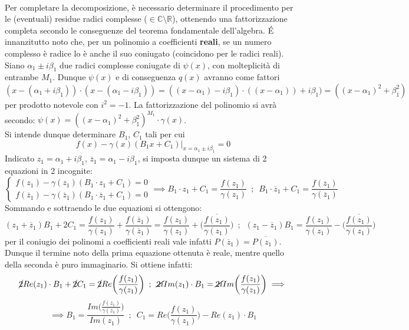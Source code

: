 \documentclass[10pt, oneside]{book}
\theoremstyle{plain}
\begin{document}
\\Per completare la decomposizione, è necessario determinare il procedimento per le (eventuali) residue radici complesse ($\in \mathbb{C} \setminus \mathbb{R}$), ottenendo una fattorizzazione completa secondo le conseguenze del teorema fondamentale dell'algebra.
\'E innanzitutto noto che, per un polinomio a coefficienti \textbf{reali}, se un numero complesso è radice lo è anche il suo coniugato (coincidono per le radici reali).
\\Siano $\alpha_1 \pm i \beta_1$ due radici complesse coniugate di $\psi(x)$, con molteplicità di entrambe $M_1$. Dunque $\psi(x)$ e di conseguenza $q(x)$ avranno come fattori $(x - (\alpha_1 + i \beta_1)) \cdot (x - (\alpha_1 - i \beta_1)) = ((x - \alpha_1) - i \beta_1) \cdot ((x - \alpha_1)) + i \beta_1) = ((x- \alpha_1)^2 + \beta_1^2)$ per prodotto notevole con $i^2 = -1$. La fattorizzazione del polinomio si avrà secondo: $\psi(x) = ((x- \alpha_1)^2 + \beta_1^2)^{M_1}\cdot \gamma(x)$.
\\Si intende dunque determinare $B_1$, $C_1$ tali per cui \[f(x) - \gamma(x)(B_1 x + C_1) \big|_{x = \alpha_1 \pm i \beta_1} = 0\]
Indicato $z_1 = \alpha_1 + i \beta_1$, $\overline{z}_1 = \alpha_1 - i \beta_1$, si imposta dunque un sistema di 2 equazioni in 2 incognite:
\[\begin{cases}
   f(z_1) - \gamma(z_1)(B_1 \cdot z_1 + C_1) = 0\\
   f(\overline{z}_1) - \gamma(\overline{z}_1)(B_1 \cdot \overline{z}_1 + C_1) = 0
\end{cases} \implies
    B_1 \cdot z_1 + C_1 = \frac{f(z_1)}{\gamma(z_1)} \enspace ; \enspace B_1 \cdot \overline{z}_1 + C_1 = \frac{f(\overline{z}_1)}{\gamma(\overline{z}_1)}\]
Sommando e sottraendo le due equazioni si ottengono:
\[(z_1 + \overline{z}_1)B_1 + 2 C_1 = \frac{f(z_1)}{\gamma(z_1)} + \frac{f(\overline{z}_1)}{\gamma(\overline{z}_1)} = \frac{f(z_1)}{\gamma(z_1)} + \overline{\bigg(\frac{f(z_1)}{\gamma(z_1)}\bigg)} \enspace ; \enspace (z_1 - \overline{z}_1)B_1 = \frac{f(z_1)}{\gamma(z_1)} - \overline{\bigg(\frac{f(z_1)}{\gamma(z_1)}\bigg)}\]
per il coniugio dei polinomi a coefficienti reali vale infatti $P(\overline{z}_1) = \overline{P(z_1)}$. Dunque il termine noto della prima equazione ottenuta è reale, mentre quello della seconda è puro immaginario. Si ottiene infatti:
\[\cancel{2}Re(z_1) \cdot B_1 + \cancel{2} C_1 = \cancel{2} Re \bigg(\frac{f(z_1)}{\gamma(z_1)}\bigg) \enspace ; \enspace \cancel{2i}Im(z_1) \cdot B_1 = \cancel{2i} Im \bigg(\frac{f(z_1)}{\gamma(z_1)}\bigg) \implies\] 
\[\implies B_1 = \frac{Im \bigg(\frac{f(z_1)}{\gamma(z_1)}\bigg)}{Im(z_1)} \enspace ; \enspace C_1 = Re \bigg(\frac{f(z_1)}{\gamma(z_1)}\bigg) - Re(z_1) \cdot B_1\]
\end{document}
